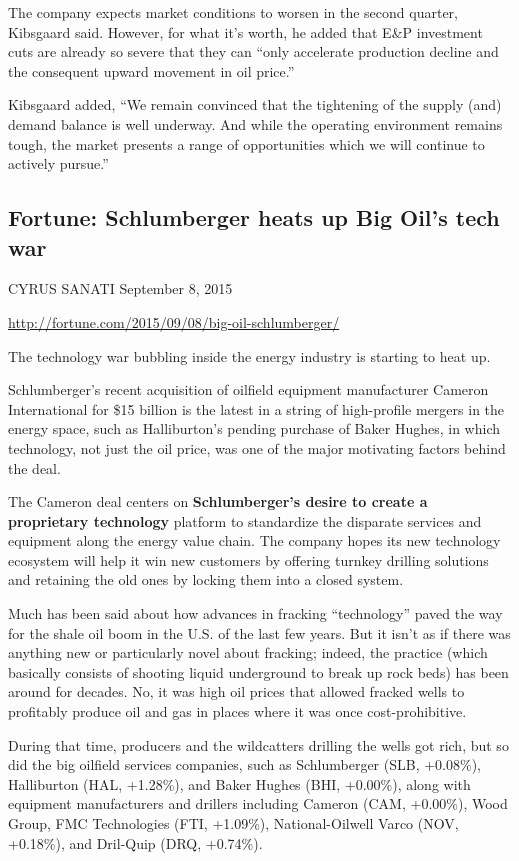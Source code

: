 \documentclass[12pt,a4paper]{article}
\begin{document}
The company expects market conditions to worsen in the second quarter,
Kibsgaard said. However, for what it's worth, he added that E\&P investment
cuts are already so severe that they can ``only accelerate production
decline and the consequent upward movement in oil price.''

Kibsgaard added, ``We remain convinced that the tightening of the supply
(and) demand balance is well underway. And while the operating environment
remains tough, the market presents a range of opportunities which we will
continue to actively pursue.''


\subsection{Fortune: Schlumberger heats up Big Oil's tech war}

CYRUS SANATI September 8, 2015

\url{http://fortune.com/2015/09/08/big-oil-schlumberger/}

The technology war bubbling inside the energy industry is starting to heat
up.

Schlumberger's recent acquisition of oilfield equipment manufacturer Cameron 
International for \$15 billion is the latest in a string of high-profile 
mergers in the energy space, such as Halliburton's pending purchase of Baker
Hughes, in which technology, not just the oil price, was one of the major 
motivating factors behind the deal.

The Cameron deal centers on \textbf{Schlumberger's desire to create a
  proprietary technology} platform to standardize the disparate services and
equipment along the energy value chain. The company hopes its new technology
ecosystem will help it win new customers by offering turnkey drilling
solutions and retaining the old ones by locking them into a closed system.

Much has been said about how advances in fracking ``technology'' paved the
way for the shale oil boom in the U.S. of the last few years. But it isn't
as if there was anything new or particularly novel about fracking; indeed,
the practice (which basically consists of shooting liquid underground to
break up rock beds) has been around for decades. No, it was high oil prices
that allowed fracked wells to profitably produce oil and gas in places where
it was once cost-prohibitive.

During that time, producers and the wildcatters drilling the wells got rich,
but so did the big oilfield services companies, such as Schlumberger (SLB,
+0.08\%), Halliburton (HAL, +1.28\%), and Baker Hughes (BHI, +0.00\%), along
with equipment manufacturers and drillers including Cameron (CAM, +0.00\%),
Wood Group, FMC Technologies (FTI, +1.09\%), National-Oilwell Varco (NOV,
+0.18\%), and Dril-Quip (DRQ, +0.74\%).
\end{document}
